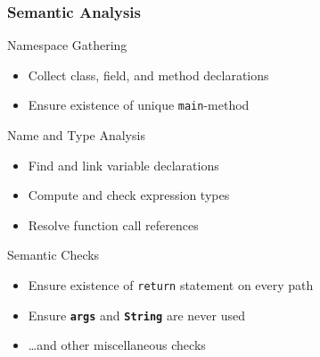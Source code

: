 \documentclass[navbaroff,en]{sdqbeamer}
\begin{document}
\begin{frame}
	\frametitle{Semantic Analysis}

	\begin{contentblock}{Namespace Gathering}
		\begin{itemize}
			\item Collect class, field, and method declarations
			\item Ensure existence of unique \texttt{main}-method
		\end{itemize}
	\end{contentblock}


	\begin{contentblock}{Name and Type Analysis}
		\begin{itemize}
			\item Find and link variable declarations
			\item Compute and check expression types
			\item Resolve function call references
		\end{itemize}
	\end{contentblock}


	\begin{contentblock}{Semantic Checks}
		\begin{itemize}
			\item Ensure existence of \texttt{return} statement on every path
			\item Ensure \texttt{\textbf{args}} and \texttt{\textbf{String}} are never used
			\item \dots and other miscellaneous checks
		\end{itemize}
	\end{contentblock}

\end{frame}
\end{document}
